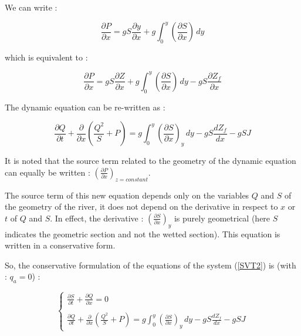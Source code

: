 \vspace{0.5cm}

We can write :

\begin{equation}
 \frac{\partial P}{\partial x} = g S \frac{\partial y}{\partial x} + g \int_{0}^y \left ( \frac{\partial S}{\partial x}\right ) \, dy
\end{equation}

which is equivalent to :

\begin{equation}
 \frac{\partial P}{\partial x} = g S \frac{\partial Z}{\partial x} + g \int_{0}^y \left ( \frac{\partial S}{\partial x}\right ) \, dy - g S \frac{\partial Z_f}{\partial x}
\end{equation}

\vspace{0.5cm}

The dynamic equation can be re-written as :

\begin{equation}
 \frac{\partial Q}{\partial t} + \frac{\partial}{\partial x} \left ( \frac{Q^2}{S} + P \right ) = g \int_{0}^y \left ( \frac{\partial S}{\partial x} \right )_y \, dy - g S \frac{dZ_f}{dx} - g S J
\end{equation}

\vspace{0.5cm}

It is noted that the source term related to the geometry of the dynamic equation can equally be written : $\left( \frac{\partial P}{\partial x} \right )_{z = constant}$.

\vspace{0.5cm}

The source term of this new equation depends only on the variables $Q$ and $S$ of the geometry of the river, it does not depend on the derivative in respect to $x$ or $t$ of $Q$ and $S$. In effect, the derivative : $\left ( \frac{\partial S}{\partial x} \right )_y$ is purely geometrical (here $S$ indicates the geometric section and not the wetted section). This equation is written in a conservative form.

\vspace{0.5cm}

So, the conservative formulation of the equations of the system (\ref{SVT2}) is (with : $q_a = 0$) :

\begin{equation}
 \label{SVT3}
 \left \lbrace
  \begin{array}{l}
    \frac{\partial S}{\partial t} + \frac{\partial Q}{\partial x} = 0 \\
    \\
    \frac{\partial Q}{\partial t} + \frac{\partial}{\partial x} \left ( \frac{Q^2}{S} + P \right ) = g \int_{0}^y \left ( \frac{\partial S}{\partial x} \right )_y \, dy - g S \frac{dZ_f}{dx} - g S J
  \end{array}
 \right.
\end{equation}


